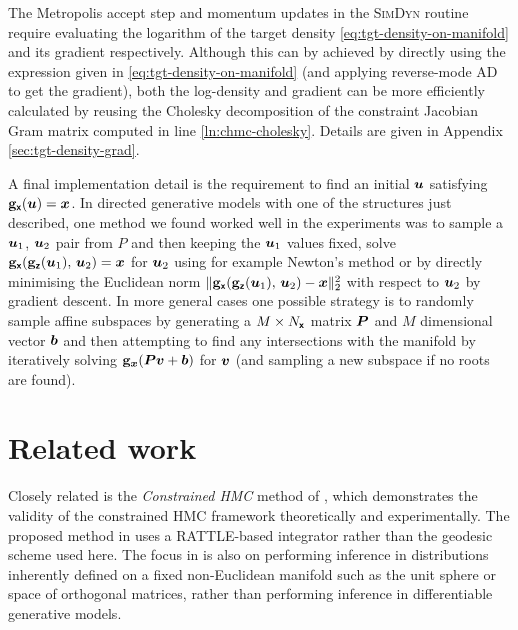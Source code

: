 The Metropolis accept step and momentum updates in the \textsc{SimDyn} routine require evaluating the logarithm of the target density \eqref{eq:tgt-density-on-manifold} and its gradient respectively. Although this can by achieved by directly using the expression given in \eqref{eq:tgt-density-on-manifold} (and applying reverse-mode \ac{AD} to get the gradient), both the log-density and gradient can be more efficiently calculated by reusing the Cholesky decomposition of the constraint Jacobian Gram matrix computed in line \ref{ln:chmc-cholesky}. Details are given in Appendix \ref{sec:tgt-density-grad}.

A final implementation detail is the requirement to find an initial $\boldsymbol{u}$ satisfying ${\mathbf{g}}_{\boldsymbol{\mathsf{x}}}(\boldsymbol{u}) = \boldsymbol{x}$. In directed generative models with one of the structures just described, one method we found worked well in the experiments was to sample a $\boldsymbol{u}_1$, $\boldsymbol{u}_2$ pair from $P$ and then keeping the $\boldsymbol{u}_1$ values fixed, solve $\genfunc_{\rvct{x}}\lpa\genfunc_{\rvct{z}}(\vct{u}_1),\,\vct{u}_2\rpa= \vct{x}$ for $\boldsymbol{u}_2$ using for example Newton's method or by directly minimising the Euclidean norm $\Vert\genfunc_{\rvct{x}}\lpa\genfunc_{\rvct{z}}(\vct{u}_1),\,\vct{u}_2\rpa - \vct{x}\Vert_2^2$ with respect to $\boldsymbol{u}_2$ by gradient descent. In more general cases one possible strategy is to randomly sample affine subspaces by generating a $M \times N_{\boldsymbol{\mathsf{x}}}$ matrix $\boldsymbol{P}$ and $M$ dimensional vector $\boldsymbol{b}$ and then attempting to find any intersections with the manifold by iteratively solving $\genfunc_{\vct{x}}\lpa\mtx{P}\vct{v} + \vct{b}\rpa$ for $\boldsymbol{v}$ (and sampling a new subspace if no roots are found).



\section{Related work}\label{sec:related-work}

Closely related is the \emph{Constrained \ac{HMC}} method of \citep{brubaker2012family}, which demonstrates the validity of the constrained \ac{HMC} framework theoretically and experimentally. The proposed method in \citep{brubaker2012family} uses a RATTLE-based integrator rather than the geodesic scheme used here. The focus in \citep{brubaker2012family} is also on performing inference in distributions inherently defined on a fixed non-Euclidean manifold such as the unit sphere or space of orthogonal matrices, rather than performing inference in differentiable generative models. %

